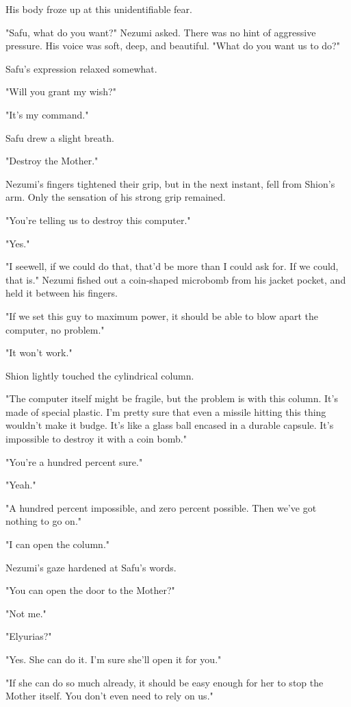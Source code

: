 His body froze up at this unidentifiable fear.

"Safu, what do you want?" Nezumi asked. There was no hint of aggressive
pressure. His voice was soft, deep, and beautiful. "What do you want us
to do?"

Safu's expression relaxed somewhat.

"\el Will you grant my wish?"

"It's my command."

Safu drew a slight breath.

"Destroy the Mother."

Nezumi's fingers tightened their grip, but in the next instant, fell
from Shion's arm. Only the sensation of his strong grip remained.

"You're telling us to destroy this computer."

"Yes."

"I see\el well, if we could do that, that'd be more than I could ask
for. If we could, that is." Nezumi fished out a coin-shaped microbomb
from his jacket pocket, and held it between his fingers.

"If we set this guy to maximum power, it should be able to blow apart
the computer, no problem."

"It won't work."

Shion lightly touched the cylindrical column.

"The computer itself might be fragile, but the problem is with this
column. It's made of special plastic. I'm pretty sure that even a
missile hitting this thing wouldn't make it budge. It's like a glass
ball encased in a durable capsule. It's impossible to destroy it with a
coin bomb."

"You're a hundred percent sure."

"Yeah."

"A hundred percent impossible, and zero percent possible. Then we've got
nothing to go on."

"I can open the column."

Nezumi's gaze hardened at Safu's words.

"You can open the door to the Mother?"

"Not me."

"Elyurias?"

"Yes. She can do it. I'm sure she'll open it for you."

"If she can do so much already, it should be easy enough for her to stop
the Mother itself. You don't even need to rely on us."

